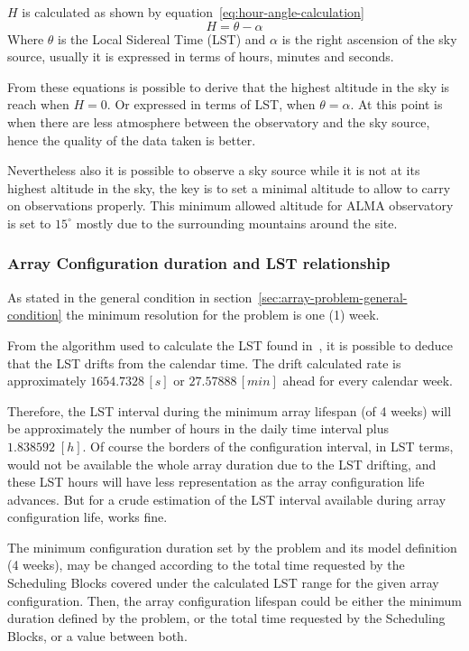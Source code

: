 $H$ is calculated as shown by equation~\ref{eq:hour-angle-calculation}
\begin{equation}
\label{eq:hour-angle-calculation}
H = \theta - \alpha
\end{equation}
Where $\theta$ is the Local Sidereal Time (LST) and $\alpha$ is the right ascension of the sky source, usually it is expressed in terms of hours, minutes and seconds.

From these equations is possible to derive that the highest altitude in the sky is reach when $H = 0$. Or expressed in terms of LST, when $\theta = \alpha$. At this point is when there are less atmosphere between the observatory and the sky source, hence the quality of the data taken is better.

Nevertheless also it is possible to observe a sky source 
while it is not at its highest altitude in the sky, the key is to set a minimal altitude to allow to carry on observations properly. This minimum allowed altitude for ALMA observatory is set to $15^\circ$ mostly due to the surrounding mountains around the site. 

\subsubsection{Array Configuration duration and LST relationship}
As stated in the general condition in section~\ref{sec:array-problem-general-condition} the minimum resolution for the problem is one (1) week.

From the algorithm used to calculate the LST found in~\cite{kaplan05}, it is possible to deduce that the LST drifts from the calendar time. The drift calculated rate is approximately $1654.7328\,[s]$ or $27.57888\,[min]$ ahead for every calendar week.

Therefore, the LST interval during the minimum array lifespan (of 4 weeks) will be approximately the number of hours in the daily time interval plus $1.838592\;[h]$.
Of course the borders of the configuration interval, in LST terms, would not be available the whole array duration due to the LST drifting, and these LST hours will have less representation as the array configuration life advances. But for a crude estimation of the LST interval available during array configuration life, works fine.

The minimum configuration duration set by the problem and its model definition (4 weeks), may be changed according to the total time requested by the Scheduling Blocks covered under the calculated LST range for the given array configuration. Then, the array configuration lifespan could be either the minimum duration defined by the problem, or the total time requested by the Scheduling Blocks, or a value between both.

